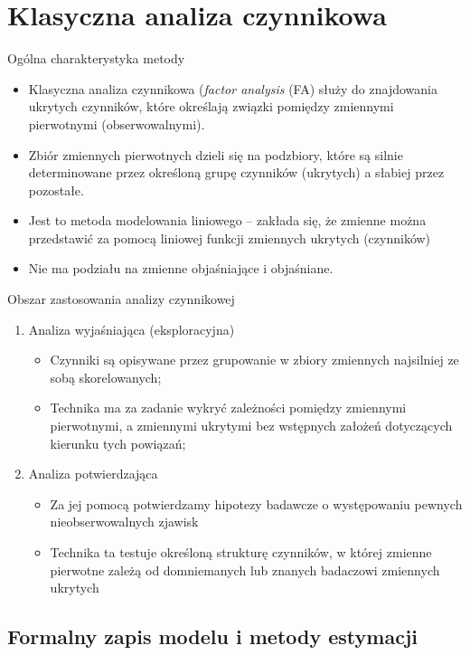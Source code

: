 \documentclass{beamer}
\begin{document}
\section{Klasyczna analiza czynnikowa}
\begin{frame}{Ogólna charakterystyka metody}
\begin{itemize}
\item Klasyczna analiza czynnikowa (\textit{factor analysis} (FA) służy do znajdowania ukrytych czynników, które określają związki pomiędzy zmiennymi pierwotnymi (obserwowalnymi).
\item Zbiór zmiennych pierwotnych dzieli się na podzbiory, które są silnie determinowane przez określoną grupę czynników (ukrytych) a słabiej przez pozostałe.
\item Jest to metoda modelowania liniowego -- zakłada się, że zmienne można przedstawić za pomocą liniowej funkcji zmiennych ukrytych (czynników)
\item Nie ma podziału na zmienne objaśniające i objaśniane.  
  \end{itemize}
\end{frame}

\begin{frame}{Obszar zastosowania analizy czynnikowej}
  \begin{enumerate}
    \item Analiza wyjaśniająca (eksploracyjna)
  \begin{itemize}
  \item Czynniki są opisywane przez grupowanie w zbiory zmiennych najsilniej ze sobą skorelowanych;
  \item Technika ma za zadanie wykryć zależności pomiędzy zmiennymi pierwotnymi, a zmiennymi ukrytymi bez wstępnych założeń dotyczących kierunku tych powiązań;
  \end{itemize}
\item Analiza potwierdzająca
  \begin{itemize}
  \item Za jej pomocą potwierdzamy hipotezy badawcze o występowaniu pewnych nieobserwowalnych zjawisk
   \item Technika ta testuje określoną strukturę czynników, w której zmienne pierwotne zależą od domniemanych lub znanych badaczowi zmiennych ukrytych
  \end{itemize}
\end{enumerate}
\end{frame}

\subsection{Formalny zapis modelu i metody estymacji}
\end{document}
